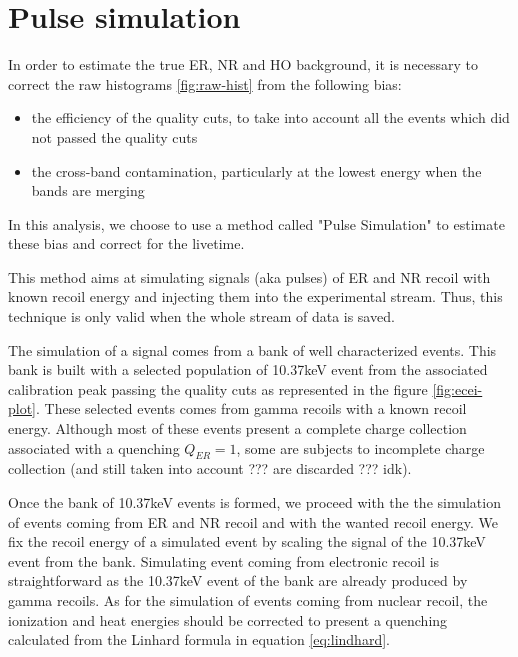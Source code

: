 \section{Pulse simulation}
\label{par:pulse-simulation}

In order to estimate the true ER, NR and HO background, it is necessary to correct the raw histograms \ref{fig:raw-hist} from the following bias:
\begin{itemize}
	\item the efficiency of the quality cuts, to take into account all the events which did not passed the quality cuts
	\item the cross-band contamination, particularly at the lowest energy when the bands are merging
\end{itemize}
In this analysis, we choose to use a method called "Pulse Simulation" to estimate these bias and correct for the livetime.

This method aims at simulating signals (aka pulses) of ER and NR recoil with known recoil energy and injecting them into the experimental stream. Thus, this technique is only valid when the whole stream of data is saved.

The simulation of a signal comes from a bank of well characterized events. This bank is built with a selected population of 10.37keV event from the associated calibration peak passing the quality cuts as represented in the figure \ref{fig:ecei-plot}. These selected events comes from gamma recoils with a known recoil energy. Although most of these events present a complete charge collection associated with a quenching $Q_{ER}=1$, some are subjects to incomplete charge collection (and still taken into account ??? are discarded ??? idk).

Once the bank of 10.37keV events is formed, we proceed with the the simulation of events coming from ER and NR recoil and with the wanted recoil energy. We fix the recoil energy of a simulated event by scaling the signal of the 10.37keV event from the bank. Simulating event coming from electronic recoil is straightforward as the 10.37keV event of the bank are already produced by gamma recoils. As for the simulation of events coming from nuclear recoil, the ionization and heat energies should be corrected to present a quenching calculated from the Linhard formula in equation \ref{eq:lindhard}.

